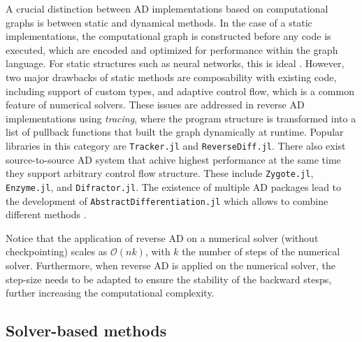 A crucial distinction between AD implementations based on computational graphs is between static and dynamical methods\cite{Baydin_Pearlmutter_Radul_Siskind_2015}. 
In the case of a static implementations, the computational graph is constructed before any code is executed, which are encoded and optimized for performance within the graph language. 
For static structures such as neural networks, this is ideal \cite{abadi-tensorflow}. 
However, two major drawbacks of static methods are composability with existing code, including support of custom types, and adaptive control flow, which is a common feature of numerical solvers. 
These issues are addressed in reverse AD implementations using \textit{tracing}, where the program structure is transformed into a list of pullback functions that built the graph dynamically at runtime. 
Popular libraries in this category are \texttt{Tracker.jl} and \texttt{ReverseDiff.jl}.
There also exist source-to-source AD system that achive highest performance at the same time they support arbitrary control flow structure. 
These include \texttt{Zygote.jl}\cite{Innes_Zygote}, \texttt{Enzyme.jl}\cite{moses_Enzyme}, and \texttt{Difractor.jl}.
The existence of multiple AD packages lead to the development of \texttt{AbstractDifferentiation.jl} which allows to combine different methods \cite{Schäfer_Tarek_White_Rackauckas_2021}. 



Notice that the application of reverse AD on a numerical solver (without checkpointing) scales as $\mathcal O (n k)$, with $k$ the number of steps of the numerical solver. 
Furthermore, when reverse AD is applied on the numerical solver, the step-size needs to be adapted to ensure the stability of the backward stesps, further increasing the computational complexity. 

\subsection{Solver-based methods}

